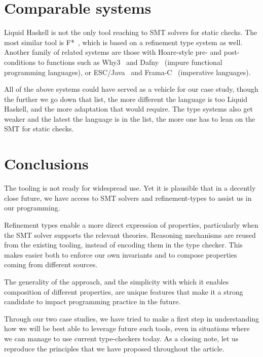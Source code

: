 \documentclass[sigconf]{acmart}
\begin{document}
\section{Comparable systems}

Liquid Haskell is not the only tool reaching to SMT solvers for static checks.
The most similar tool is F*~\cite{swamy16}, which is based on a refinement type
system as well. Another family of related systems are those with Hoare-style
pre- and post-conditions to functions such as Why3~\cite{filli13} and
Dafny~\cite{leino17} (impure functional programming languages), or
ESC/Java~\cite{flanagan02} and Frama-C~\cite{kosmatov24} (imperative languages).

All of the above systems could have served as a vehicle for our case study,
though the further we go down that list, the more different the language is too
Liquid Haskell, and the more adaptation that would require. The type systems
also get weaker and the latest the language is in the list, the more one has to
lean on the SMT for static checks.

\section{Conclusions}
\label{conclusions}

The tooling is not ready for widespread use. Yet it is plausible that in a decently
close future, we have access to SMT solvers and refinement-types to assist us in
our programming.

Refinement types enable a more direct expression of properties,
particularly when the SMT solver supports the relevant theories. Reasoning
mechanisms are reused from the existing tooling, instead of encoding them
in the type checker. This makes easier both to enforce our own invariants and to
compose properties coming from different sources.

The generality of the approach, and the simplicity with which it enables
composition of different properties, are unique features that make it a strong
candidate to impact programming practice in the future.

Through our two case studies, we have tried to make a first step in
understanding how we will be best able to leverage future such tools, even
in situations where we can manage to use current type-checkers today. As a closing
note, let us reproduce the principles that we have proposed throughout the article.

\vspace{-0.8cm}
\listofkeytheorems[
  ignoreall,
  show={principle},
  print-body,
  title={},
  ]



\end{document}
